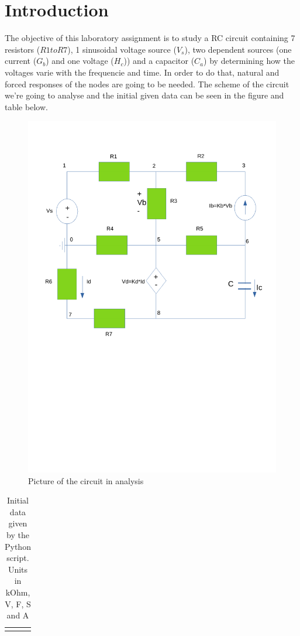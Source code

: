 \section{Introduction}
\label{sec:introduction}

\par The objective of this laboratory assignment is to study a RC circuit containing 7 resistors ($R1 to R7$), 1 sinusoidal voltage source ($V_s$), two dependent sources (one current ($G_b$) and one voltage ($H_c$)) and a capacitor ($C_a$) by determining how the voltages varie with the frequencie and time. In order to do that, natural and forced responses of the nodes are going to be needed.
The scheme of the circuit we're going to analyse and the initial given data can be seen in the figure and table below.

\begin{figure}[h] \centering
\includegraphics[width=0.6\linewidth]{Desenho_intro.pdf}
\caption{Picture of the circuit in analysis}
\label{fig:V(t)}
\end{figure}

\begin{table}[H]
\centering
\begin{tabularx}{0.8\textwidth} {
  | >{\raggedright\arraybackslash}X
  | >{\raggedleft\arraybackslash}X | }
 \hline
  \caption{Initial data given by the Python script. Units in kOhm, V, F, S and A}
 
\end{tabularx}
\end{table}

